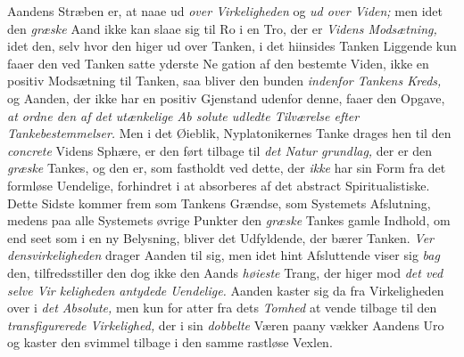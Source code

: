 Aandens Stræben er, at naae ud \emph{over Virkeligheden}
og \emph{ud over Viden;} men idet den \emph{græske} Aand ikke kan
slaae sig til Ro i en Tro, der er \emph{Videns Modsætning,} idet
den, selv hvor den higer ud over Tanken, i det hiinsides
Tanken Liggende kun faaer den ved Tanken satte yderste Ne\-%
gation af den bestemte Viden, ikke en positiv Modsætning til
Tanken, saa bliver den bunden \emph{indenfor Tankens Kreds,}
og Aanden, der ikke har en positiv Gjenstand udenfor denne,
faaer den Opgave, \emph{at ordne den af det utænkelige Ab\-%
solute udledte Tilværelse efter Tankebestemmelser.}
 \setcounter{footnote}{0}
Men i det Øieblik, Nyplatonikernes Tanke drages hen til den
\emph{concrete} Videns Sphære, er den ført tilbage til \emph{det Natur\-%
grundlag,} der er den \emph{græske} Tankes, og den er, som fastholdt
ved dette, der \emph{ikke} har sin Form fra det formløse Uendelige,
forhindret i at absorberes af det abstract Spiritualistiske. Dette
Sidste kommer frem som Tankens Grændse, som Systemets
Afslutning, medens paa alle Systemets øvrige Punkter den
\emph{græske} Tankes gamle Indhold, om end seet som i en ny
Belysning, bliver det Udfyldende, der bærer Tanken. \emph{Ver\-%
densvirkeligheden} drager Aanden til sig, men idet hint
Afsluttende viser sig \emph{bag} den, tilfredsstiller den dog ikke den
Aands \emph{høieste} Trang, der higer mod \emph{det ved selve Vir\-%
keligheden antydede Uendelige.} Aanden kaster sig da
fra Virkeligheden over i \emph{det Absolute,} men kun for atter
fra dets \emph{Tomhed} at vende tilbage til den \emph{transfigurerede
Virkelighed,} der i sin \emph{dobbelte} Væren paany vækker
Aandens Uro og kaster den svimmel tilbage i den samme
rastløse Vexlen.

